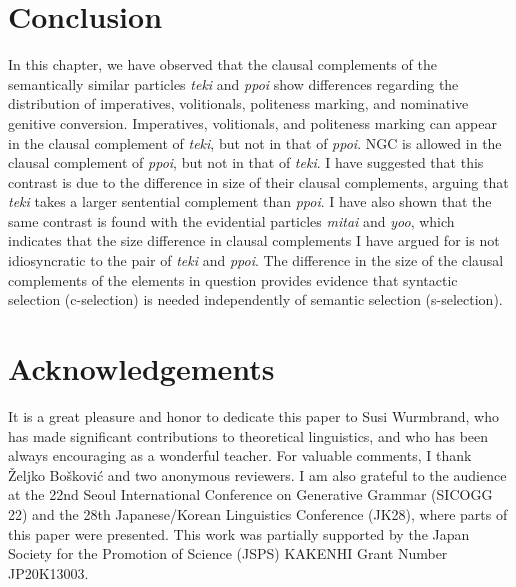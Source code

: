 \documentclass[output=paper]{langscibook}
\begin{document}
\section{Conclusion} \label{saitos5}
In this chapter, we have observed that the clausal complements of the semantically similar particles \emph{teki} and \emph{ppoi} show differences regarding the distribution of imperatives, volitionals, politeness marking, and nominative genitive conversion. Imperatives, volitionals, and politeness marking can appear in the clausal complement of \emph{teki}, but not in that of \emph{ppoi}. NGC is allowed in the clausal complement of \emph{ppoi}, but not in that of \emph{teki}. I have suggested that this contrast is due to the difference in size of their clausal complements, arguing that \emph{teki} takes a larger sentential complement than \emph{ppoi}. I have also shown that the same contrast is found with the evidential particles \emph{mitai} and \emph{yoo}, which indicates that the size difference in clausal complements I have argued for is not idiosyncratic to the pair of \emph{teki} and \emph{ppoi}. The difference in the size of the clausal complements of the elements in question provides evidence that syntactic selection (c-selection) is needed independently of semantic selection (s-selection).

\section*{Acknowledgements}
It is a great pleasure and honor to dedicate this paper to Susi Wurmbrand, who has made significant contributions to theoretical linguistics, and who has been always encouraging as a wonderful teacher. For valuable comments, I thank Željko Bošković and two anonymous reviewers. I am also grateful to the audience at the 22nd Seoul International Conference on Generative Grammar (SICOGG 22) and the 28th Japanese/Korean Linguistics Conference (JK28), where parts of this paper were presented. This work was partially supported by the Japan Society for the Promotion of Science (JSPS) KAKENHI Grant Number JP20K13003.

{\sloppy\printbibliography[heading=subbibliography,notkeyword=this]}
\end{document}

